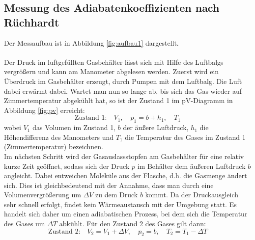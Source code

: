 \documentclass[a4paper,10pt]{article}
\begin{document}
\subsection{Messung des Adiabatenkoeffizienten nach Rüchhardt}
Der Messaufbau ist in Abbildung \ref{fig:aufbau1} dargestellt.\\\\
Der Druck im luftgefüllten Gasbehälter lässt sich mit Hilfe des Luftbalgs vergrößern und kann am Manometer abgelesen werden. Zuerst wird ein Überdruck im Gasbehälter erzeugt, durch Pumpen mit dem Luftbalg. Die Luft dabei erwärmt dabei. Wartet man nun so lange ab, bis sich das Gas wieder auf Zimmertemperatur abgekühlt hat, so ist der Zustand 1 im pV-Diagramm in Abbildung \ref{fig:pv} erreicht:
\begin{equation}
  \text{Zustand 1:}\quad V_1,\quad p_1=b+h_1, \quad T_1
\end{equation}
wobei \(V_1\) das Volumen im Zustand 1, \(b\) der äußere Luftdruck, \(h_1\) die Höhendifferenz des Manometers und \(T_1\) die Temperatur des Gases im Zustand 1 (Zimmertemperatur) bezeichnen. \\ Im nächsten Schritt wird der Gasauslassstopfen am Gasbehälter für eine relativ kurze Zeit geöffnet, sodass sich der Druck \(p\) im Behälter dem äußeren Luftdruck \(b\) angleicht. Dabei entweichen Moleküle aus der Flasche, d.h. die Gasmenge ändert sich. Dies ist gleichbedeutend mit der Annahme, dass man durch eine Volumenvergrößerung um \(\Delta V\) zu dem Druck \(b\) kommt. Da der Druckausgleich sehr schnell erfolgt, findet kein Wärmeaustausch mit der Umgebung statt. Es handelt sich daher um einen adiabatischen Prozess, bei dem sich die Temperatur des Gases um \(\Delta T\) abkühlt. Für den Zustand 2 des Gases gilt dann:
\begin{equation}
  \text{Zustand 2:}\quad V_2= V_1+ \Delta V,\quad p_2=b, \quad T_2=T_1 - \Delta T
\end{equation}
\end{document}
